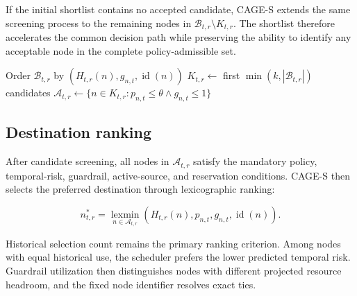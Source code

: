 If the initial shortlist contains no accepted candidate, CAGE-S extends
the same screening process to the remaining nodes in
$\mathcal{B}_{t,r}\setminus K_{t,r}$. The shortlist therefore accelerates
the common decision path while preserving the ability to identify any
acceptable node in the complete policy-admissible set.

\begin{algorithm}[t]
\caption{Fairness-aware candidate shortlisting}
\label{alg:fair-shortlisting}

Order $\mathcal{B}_{t,r}$ by
$\left(H_{t,r}(n),g_{n,t},\operatorname{id}(n)\right)$\;
$K_{t,r}\leftarrow$ first
$\min(k,|\mathcal{B}_{t,r}|)$ candidates\;
$\mathcal{A}_{t,r}\leftarrow
\{n\in K_{t,r}:
p_{n,t}\leq\theta
\land g_{n,t}\leq1\}$\;

\;
\end{algorithm}

\subsection{Destination ranking}

After candidate screening, all nodes in $\mathcal{A}_{t,r}$ satisfy the
mandatory policy, temporal-risk, guardrail, active-source, and reservation
conditions. CAGE-S then selects the preferred destination through
lexicographic ranking:

\begin{equation}
\label{eq:method-destination-ranking}
    n^{*}_{t,r}
    =
    \operatorname*{lexmin}_{n\in\mathcal{A}_{t,r}}
    \left(
        H_{t,r}(n),
        p_{n,t},
        g_{n,t},
        \operatorname{id}(n)
    \right).
\end{equation}

Historical selection count remains the primary ranking criterion. Among
nodes with equal historical use, the scheduler prefers the lower
predicted temporal risk. Guardrail utilization then distinguishes nodes
with different projected resource headroom, and the fixed node identifier
resolves exact ties.

